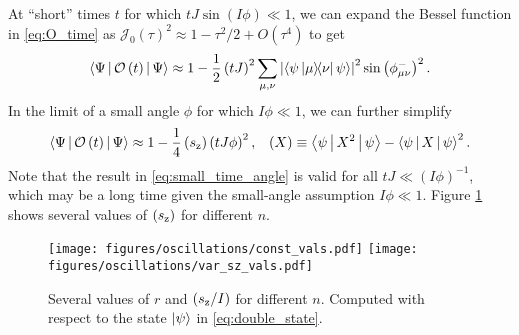 \documentclass[nofootinbib,notitlepage,11pt]{revtex4-2}
\newcommand{\f}[2]{\dfrac{#1}{#2}} %
\newcommand{\p}[1]{\left(#1\right)} %
\newcommand{\bk}{\Braket} %
\newcommand{\1}{\mathds{1}}
\newcommand{\z}{\text{z}}
\newcommand{\J}{\mathcal{J}}
\renewcommand{\O}{\mathcal{O}}
\let\var\relax
\DeclareMathOperator{\var}{var}
\begin{document}
At ``short'' times $t$ for which $tJ\sin\p{I\phi}\ll1$, we can expand
the Bessel function in \eqref{eq:O_time} as
$\J_0\p{\tau}^2\approx1-\tau^2/2+O\p{\tau^4}$ to get
\begin{align}
  \bk{\Psi|\O\p{t}|\Psi}
  \approx 1 - \f12 \p{tJ}^2 \sum_{\mu,\nu}
  \abs{\bk{\psi\op{\mu}{\nu}\psi}}^2 \sin\p{\phi_{\mu\nu}^-}^2.
\end{align}
In the limit of a small angle $\phi$ for which $I\phi\ll1$, we can
further simplify
\begin{align}
  \bk{\Psi|\O\p{t}|\Psi}
  \approx 1 - \f14 \var\p{s_\z} \p{tJ\phi}^2,
  &&
  \var\p{X} \equiv \bk{\psi|X^2|\psi} - \bk{\psi|X|\psi}^2.
  \label{eq:small_time_angle}
\end{align}
Note that the result in \eqref{eq:small_time_angle} is valid for all
$tJ\ll\p{I\phi}^{-1}$, which may be a long time given the small-angle
assumption $I\phi\ll1$.  Figure \ref{fig:limiting_vals} shows several
values of $\var\p{s_\z}$ for different $n$.

\begin{figure}
  \centering
  \texttt{[image: figures/oscillations/const\_vals.pdf]}
  \texttt{[image: figures/oscillations/var\_sz\_vals.pdf]}
  \caption{Several values of $r$ and $\var\p{s_\z/I}$ for different
    $n$.  Computed with respect to the state $\ket\psi$ in
    \eqref{eq:double_state}.}
  \label{fig:limiting_vals}
\end{figure}
\end{document}
